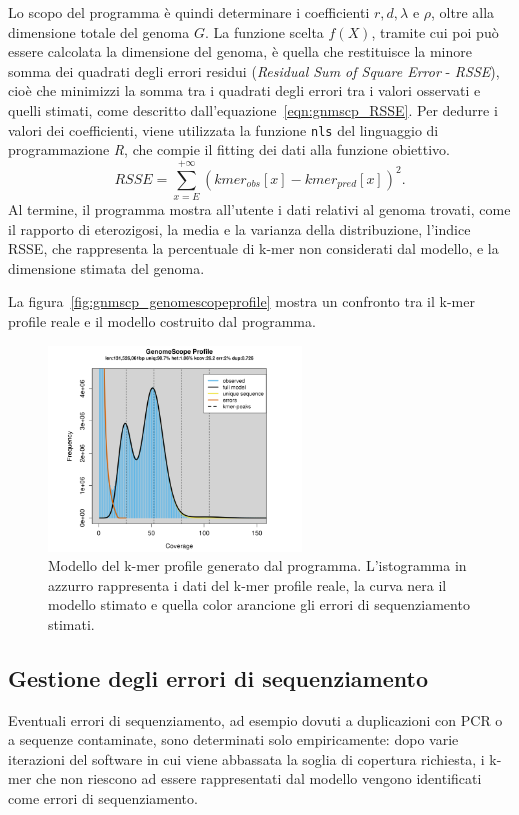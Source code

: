 \documentclass[crop=false, class=book]{standalone}
\begin{document}
	Lo scopo del programma è quindi determinare i coefficienti $r, d, \lambda$ e $\rho$, oltre alla dimensione totale del genoma $G$. La funzione scelta $f(X)$, tramite cui poi può essere calcolata la dimensione del genoma, è quella che restituisce la minore somma dei quadrati degli errori residui (\textit{Residual Sum of Square Error} - \textit{RSSE}), cioè che minimizzi la somma tra i quadrati degli errori tra i valori osservati e quelli stimati, come descritto dall'equazione~\vref{eqn:gnmscp_RSSE}. Per dedurre i valori dei coefficienti, viene utilizzata la funzione \verb|nls| del linguaggio di programmazione \textit{R}, che compie il \gls{fitting} dei dati alla funzione obiettivo.
	\begin{equation}
		RSSE = \sum_{x=E}^{+\infty} \left(kmer_{obs}[x] - kmer_{pred}[x]\right)^2.
	\label{eqn:gnmscp_RSSE}
	\end{equation}
	Al termine, il programma mostra all'utente i dati relativi al genoma trovati, come il rapporto di eterozigosi, la media e la varianza della distribuzione, l'indice RSSE, che rappresenta la percentuale di k-mer non considerati dal modello, e la dimensione stimata del genoma.
	
	La figura~\vref{fig:gnmscp_genomescopeprofile} mostra un confronto tra il k-mer profile reale e il modello costruito dal programma.
	
	\begin{figure}
		\centering
		\includegraphics[width=0.6\textwidth]{capitoli/genomescope/gnmscp_genomescopeprofile.png}
		\caption{Modello del k-mer profile generato dal programma. L'istogramma in azzurro rappresenta i dati del k-mer profile reale, la curva nera il modello stimato e quella color arancione gli errori di sequenziamento stimati.}
		\label{fig:gnmscp_genomescopeprofile}
	\end{figure}


	\subsection{Gestione degli errori di sequenziamento}
	Eventuali errori di sequenziamento, ad esempio dovuti a duplicazioni con PCR o a sequenze contaminate, sono determinati solo empiricamente: dopo varie iterazioni del software in cui viene abbassata la soglia di copertura richiesta, i k-mer che non riescono ad essere rappresentati dal modello vengono identificati come errori di sequenziamento. 
	
\end{document}
